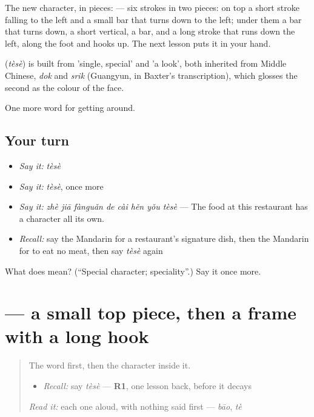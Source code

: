 The new character, in pieces:  — six strokes in two pieces: on top a short stroke falling to the left and a small bar that turns down to the left; under them a bar that turns down, a short vertical, a bar, and a long stroke that runs down the left, along the foot and hooks up. The next lesson puts it in your hand.

\begin{cousinweb}
\textbf{} (\emph{tèsè}) is built from  'single, special' and  'a look', both inherited from Middle Chinese, \emph{dok} and \emph{srik} (Guangyun, in Baxter's transcription), which glosses the second as the colour of the face.
\end{cousinweb}

\begin{grammarlens}[title={What you've built}]
One more word for getting around.
\end{grammarlens}

\subsection*{Your turn}
\begin{itemize}
\raggedright
  \item \emph{Say it:} \emph{tèsè}
  \item \emph{Say it:} \emph{tèsè}, once more
  \item \emph{Say it:} \emph{zhè jiā fànguǎn de cài hěn yǒu tèsè} — The food at this restaurant has a character all its own.
  \item \emph{Recall:} say the Mandarin for a restaurant's signature dish, then the Mandarin for to eat no meat, then say \emph{tèsè} again
\end{itemize}

\begin{tcolorbox}[breakable,colback=teal!4,colframe=teal!35!black,title={Before you move on}]
What does  mean? (\textquotedblleft{}Special character; speciality\textquotedblright{}.) Say it once more.
\end{tcolorbox}
\section[\texorpdfstring{\zh{色} (sè)}{色 (sè)}]{ — a small top piece, then a frame with a long hook}

\label{lesson:ZH-W451-se-colour}



\begin{quote}
The word first, then the character inside it.

\begin{itemize}
\raggedright
  \item \emph{Recall:} say \emph{tèsè} — \textbf{R1}, one lesson back, before it decays
\end{itemize}

\begin{quote}
 
\end{quote}

\emph{Read it:} each one aloud, with nothing said first — \emph{bāo}, \emph{tè}
\end{quote}

